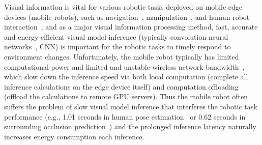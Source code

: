 Visual information is vital for various robotic tasks deployed on mobile edge devices (mobile robots), such as navigation~\cite{ran2017convolutional}, manipulation~\cite{bayar2018constrained}, and human-robot interaction~\cite{wu2019weight};
and as a major visual information processing method, fast, accurate and energy-efficient visual model inference (typically convolution neural networks~\cite{kapao,targ2016resnet,woo2023convnext}, CNN) is important for the robotic tasks to timely respond to environment changes. 
Unfortunately, the mobile robot typically has limited computational power and limited and unstable wireless network bandwidth~\cite{yang2022mobile}, which slow down the inference speed via both local computation (complete all inference calculations on the edge device itself) and computation offloading (offload the calculations to remote GPU servers).
Thus the mobile robot often suffers the problem of slow visual model inference that interferes the robotic task performance (e.g., 1.01 seconds in human pose estimation~\cite{kapao} or 0.62 seconds in surrounding occlusion prediction~\cite{agrnav}) and the prolonged inference latency naturally increases energy consumption each inference.

